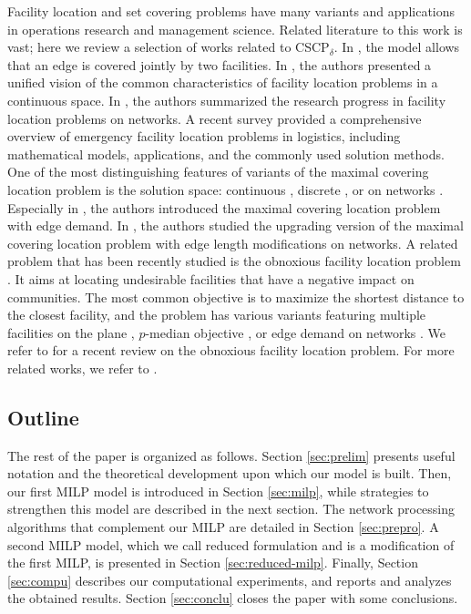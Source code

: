 \documentclass[review]{elsarticle}
\newcommand{\dlt}{{\delta}}
\newcommand{\problem}{CSCP$_\dlt$}
\theoremstyle{definition}
\begin{document}
Facility location and set covering problems have many variants and applications in operations research and management science. Related literature to this work is vast; here we review a selection of works related to \problem. In \cite{sadigh2010mixed}, the model allows that an edge is covered jointly by two facilities. In \cite{schbel2019}, the authors presented a unified vision of the common characteristics of facility location problems in a continuous space. In \cite{puerto2018extensive}, the authors summarized the research progress in facility location problems on networks. A recent survey \cite{wang2021emergency} provided a comprehensive overview of  emergency facility location problems in logistics, including mathematical models, applications, and the commonly used solution methods.  One of the most distinguishing features of variants of the maximal covering location problem is the solution space: continuous \cite{chapter-plastria, bansal2017planar}, discrete \cite{chapter-marin, cordeau2019benders}, or on networks \cite{bucarey2022benders,berman2016covering}. Especially in \cite{berman2016covering}, the authors  introduced the maximal covering location problem with edge demand. In \cite{baldomero2022upgrading}, the authors studied the upgrading version of the maximal covering location problem with edge length modifications on networks. A related problem that has been recently studied is the obnoxious facility location problem \cite{drezner2018weber}. It aims at locating undesirable facilities that have a negative impact on communities. The most common  objective is to maximize the shortest distance to the closest facility, and the problem has various variants featuring multiple facilities on the plane \cite{drezner2019planar,kalczynski2021obnoxious}, $p$-median objective \cite{kalczynski2022obnoxious}, or edge demand on networks \cite{berman2016covering}. We refer to \cite{church2022review} for a recent review on the obnoxious facility location problem. For more related works, we refer to \cite{akgun2015risk,paul2017multiobjective,fukunaga2016covering,berman2011big,hudec1994confined}. 


\subsection{Outline}
The rest of the paper is organized as follows. Section \ref{sec:prelim} presents useful notation and the theoretical development upon which our model is built. Then, our first MILP model is introduced in Section \ref{sec:milp}, while strategies to strengthen this model are described in the next section. The network processing algorithms that complement our MILP are detailed in Section \ref{sec:prepro}. A second MILP model, which we call reduced formulation and is a modification of the first MILP, is presented in Section \ref{sec:reduced-milp}. Finally, Section \ref{sec:compu} describes our computational experiments, and reports and analyzes the obtained results. Section \ref{sec:conclu} closes the paper with some conclusions.
\end{document}
